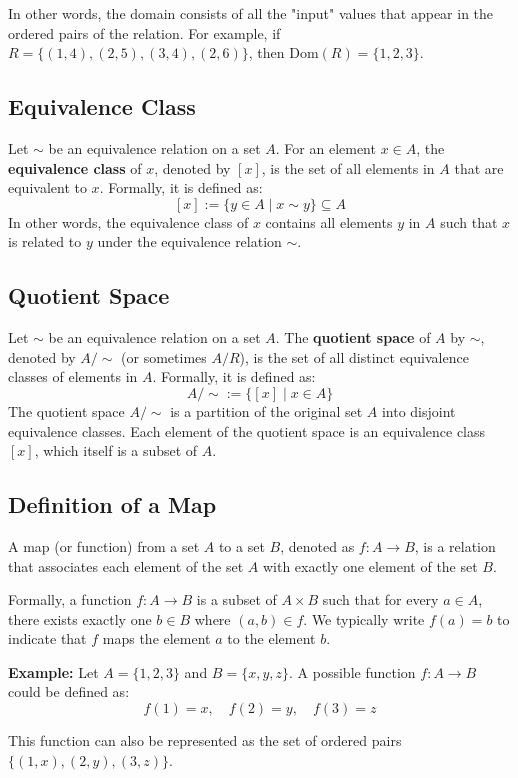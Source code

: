 In other words, the domain consists of all the "input" values that appear in the ordered pairs of the relation. For example, if $R = \{(1,4), (2,5), (3,4), (2,6)\}$, then $\text{Dom}(R) = \{1, 2, 3\}$.

\subsection{Equivalence Class}
\label{subsection:equivalence_class}
Let $\sim$ be an equivalence relation on a set $A$. For an element $x \in A$, the \textbf{equivalence class} of $x$, denoted by $[x]$, is the set of all elements in $A$ that are equivalent to $x$. Formally, it is defined as:
\[[x] := \{y \in A \mid x \sim y\} \subseteq A\]
In other words, the equivalence class of $x$ contains all elements $y$ in $A$ such that $x$ is related to $y$ under the equivalence relation $\sim$.

\subsection{Quotient Space}
\label{subsection:quotient_space}
Let $\sim$ be an equivalence relation on a set $A$. The \textbf{quotient space} of $A$ by $\sim$, denoted by $A/\sim$ (or sometimes $A/R$), is the set of all distinct equivalence classes of elements in $A$. Formally, it is defined as:
\[A/\sim := \{[x] \mid x \in A\}\]
The quotient space $A/\sim$ is a partition of the original set $A$ into disjoint equivalence classes. Each element of the quotient space is an equivalence class $[x]$, which itself is a subset of $A$.

\subsection{Definition of a Map}
A map (or function) from a set $A$ to a set $B$, denoted as $f: A \rightarrow B$, is a relation that associates each element of the set $A$ with exactly one element of the set $B$. 

Formally, a function $f: A \rightarrow B$ is a subset of $A \times B$ such that for every $a \in A$, there exists exactly one $b \in B$ where $(a,b) \in f$. We typically write $f(a) = b$ to indicate that $f$ maps the element $a$ to the element $b$.

\textbf{Example:} Let $A = \{1, 2, 3\}$ and $B = \{x, y, z\}$. A possible function $f: A \rightarrow B$ could be defined as:
\[
f(1) = x, \quad f(2) = y, \quad f(3) = z
\]

This function can also be represented as the set of ordered pairs $\{(1,x), (2,y), (3,z)\}$.

